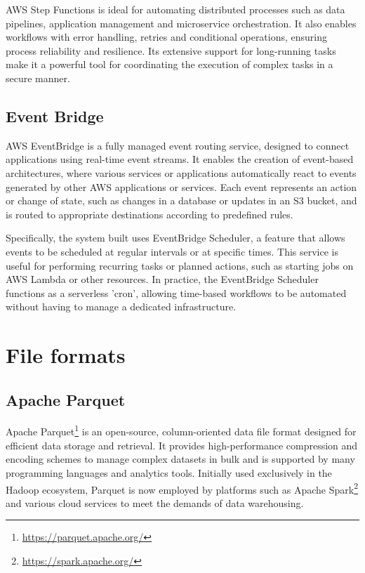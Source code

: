 \ac{AWS} Step Functions is ideal for automating distributed processes such as data pipelines, application management and microservice orchestration. It also enables workflows with error handling, retries and conditional operations, ensuring process reliability and resilience. Its extensive support for long-running tasks make it a powerful tool for coordinating the execution of complex tasks in a secure manner.
\subsection{Event Bridge}
\ac{AWS} EventBridge is a fully managed event routing service, designed to connect applications using real-time event streams. It enables the creation of event-based architectures, where various services or applications automatically react to events generated by other \ac{AWS} applications or services. Each event represents an action or change of state, such as changes in a database or updates in an \ac{S3} bucket, and is routed to appropriate destinations according to predefined rules.

Specifically, the system built uses EventBridge Scheduler, a feature that allows events to be scheduled at regular intervals or at specific times. This service is useful for performing recurring tasks or planned actions, such as starting jobs on \ac{AWS} Lambda or other resources. In practice, the EventBridge Scheduler functions as a serverless 'cron', allowing time-based workflows to be automated without having to manage a dedicated infrastructure.
\section{File formats}
\subsection{Apache Parquet}
\label{sec:parquet}
Apache Parquet\footnote{\url{https://parquet.apache.org/}} is an open-source, column-oriented data file format designed for efficient data storage and retrieval. It provides high-performance compression and encoding schemes to manage complex datasets in bulk and is supported by many programming languages and analytics tools. Initially used exclusively in the Hadoop ecosystem, Parquet is now employed by platforms such as Apache Spark\footnote{\url{https://spark.apache.org/}} and various cloud services to meet the demands of data warehousing.

